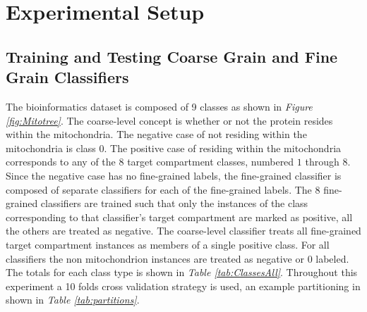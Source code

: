 \documentclass[ms]{nuthesis}
\begin{document}
\chapter{Experimental Setup}
\section{Training and Testing Coarse Grain and Fine Grain Classifiers}
\par The bioinformatics dataset is composed of 9 classes as shown in
\textit{Figure \ref{fig:Mitotree}}. The coarse-level concept is whether or not
the protein resides within the mitochondria. The negative case of not residing within the mitochondria is class $0$.
The positive case of residing within the
  mitochondria corresponds to any of the $8$ target compartment classes,  numbered $1$ through $8$. Since the
  negative case has no fine-grained labels, the fine-grained classifier is composed of separate classifiers
  for each of the fine-grained labels. The $8$ fine-grained classifiers are trained such that only the instances of
  the class corresponding to that classifier's target compartment are marked as positive, all the others are treated
  as negative. The coarse-level classifier treats all fine-grained target compartment
  instances as members of a single positive class. For all classifiers the non mitochondrion instances are treated as
  negative or $0$ labeled. The totals for each class type is shown in \textit{Table \ref{tab:ClassesAll}}. Throughout
  this experiment a 10 folds cross validation strategy is used, an example partitioning in shown in
  \textit{Table \ref{tab:partitions}}.
\end{document}
